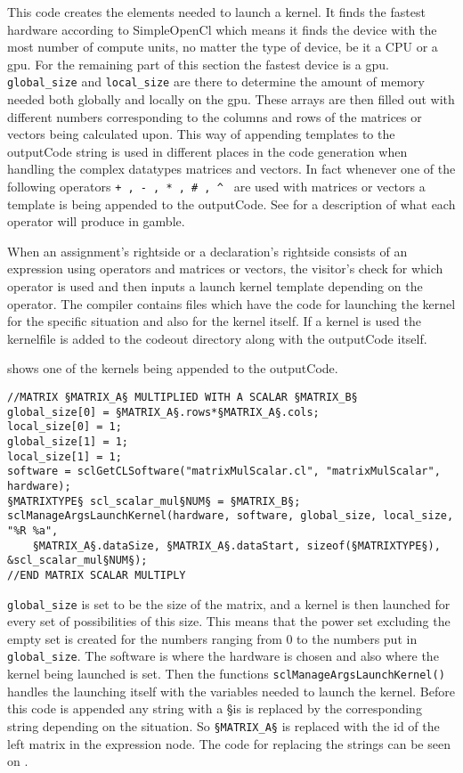 This code creates the elements needed to launch a kernel.
It finds the fastest hardware according to SimpleOpenCl which means it finds the device with the most number of compute units, no matter the type of device, be it a CPU or a \acrshort{gpu}.
For the remaining part of this section the fastest device is a \acrshort{gpu}.
\texttt{global\_size} and \texttt{local\_size} are there to determine the amount of memory needed both globally and locally on the \acrshort{gpu}.
These arrays are then filled out with different numbers corresponding to the columns and rows of the matrices or vectors being calculated upon.
This way of appending templates to the outputCode string is used in different places in the code generation when handling the complex datatypes matrices and vectors.
In fact whenever one of the following operators \texttt{+ , - , * , \# , \^ } are used with matrices or vectors a template is being appended to the outputCode.
See  for a description of what each operator will produce in gamble.

When an assignment's rightside or a declaration's rightside consists of an expression using operators and matrices or vectors, the visitor's check for which operator is used and then inputs a launch kernel template depending on the operator.
The compiler contains files which have the code for launching the kernel for the specific situation and also for the kernel itself.
If a kernel is used the kernelfile is added to the codeout directory along with the outputCode itself.

 shows one of the kernels being appended to the outputCode.

\begin{lstlisting}[caption=SimpleOpenCL launch of a kernel calculating a matrix or vector multiplied with a scalar.,numbers=none,frame=tlrb,label={lst:kernelLaunch}]
//MATRIX §MATRIX_A§ MULTIPLIED WITH A SCALAR §MATRIX_B§
global_size[0] = §MATRIX_A§.rows*§MATRIX_A§.cols;
local_size[0] = 1;
global_size[1] = 1;
local_size[1] = 1;
software = sclGetCLSoftware("matrixMulScalar.cl", "matrixMulScalar", hardware);
§MATRIXTYPE§ scl_scalar_mul§NUM§ = §MATRIX_B§;
sclManageArgsLaunchKernel(hardware, software, global_size, local_size, "%R %a",
    §MATRIX_A§.dataSize, §MATRIX_A§.dataStart, sizeof(§MATRIXTYPE§), &scl_scalar_mul§NUM§);
//END MATRIX SCALAR MULTIPLY
\end{lstlisting}

\texttt{global\_size} is set to be the size of the matrix, and a kernel is then launched for every set of possibilities of this size.
This means that the power set excluding the empty set is created for the numbers ranging from 0 to the numbers put in \texttt{global\_size}.
The software is where the hardware is chosen and also where the kernel being launched is set.
Then the functions \texttt{sclManageArgsLaunchKernel()} handles the launching itself with the variables needed to launch the kernel.
Before this code is appended any string with a \S is is replaced by the corresponding string depending on the situation.
So \texttt{§MATRIX\_A§} is replaced with the id of the left matrix in the expression node.
The code for replacing the strings can be seen on .

